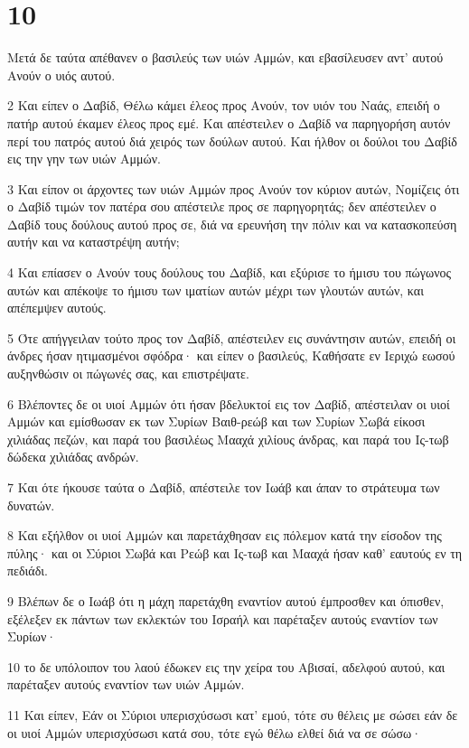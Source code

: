 \chapter{10}

\par Μετά δε ταύτα απέθανεν ο βασιλεύς των υιών Αμμών, και εβασίλευσεν αντ' αυτού Ανούν ο υιός αυτού.
\par 2 Και είπεν ο Δαβίδ, Θέλω κάμει έλεος προς Ανούν, τον υιόν του Ναάς, επειδή ο πατήρ αυτού έκαμεν έλεος προς εμέ. Και απέστειλεν ο Δαβίδ να παρηγορήση αυτόν περί του πατρός αυτού διά χειρός των δούλων αυτού. Και ήλθον οι δούλοι του Δαβίδ εις την γην των υιών Αμμών.
\par 3 Και είπον οι άρχοντες των υιών Αμμών προς Ανούν τον κύριον αυτών, Νομίζεις ότι ο Δαβίδ τιμών τον πατέρα σου απέστειλε προς σε παρηγορητάς; δεν απέστειλεν ο Δαβίδ τους δούλους αυτού προς σε, διά να ερευνήση την πόλιν και να κατασκοπεύση αυτήν και να καταστρέψη αυτήν;
\par 4 Και επίασεν ο Ανούν τους δούλους του Δαβίδ, και εξύρισε το ήμισυ του πώγωνος αυτών και απέκοψε το ήμισυ των ιματίων αυτών μέχρι των γλουτών αυτών, και απέπεμψεν αυτούς.
\par 5 Ότε απήγγειλαν τούτο προς τον Δαβίδ, απέστειλεν εις συνάντησιν αυτών, επειδή οι άνδρες ήσαν ητιμασμένοι σφόδρα· και είπεν ο βασιλεύς, Καθήσατε εν Ιεριχώ εωσού αυξηνθώσιν οι πώγωνές σας, και επιστρέψατε.
\par 6 Βλέποντες δε οι υιοί Αμμών ότι ήσαν βδελυκτοί εις τον Δαβίδ, απέστειλαν οι υιοί Αμμών και εμίσθωσαν εκ των Συρίων Βαιθ-ρεώβ και των Συρίων Σωβά είκοσι χιλιάδας πεζών, και παρά του βασιλέως Μααχά χιλίους άνδρας, και παρά του Ις-τωβ δώδεκα χιλιάδας ανδρών.
\par 7 Και ότε ήκουσε ταύτα ο Δαβίδ, απέστειλε τον Ιωάβ και άπαν το στράτευμα των δυνατών.
\par 8 Και εξήλθον οι υιοί Αμμών και παρετάχθησαν εις πόλεμον κατά την είσοδον της πύλης· και οι Σύριοι Σωβά και Ρεώβ και Ις-τωβ και Μααχά ήσαν καθ' εαυτούς εν τη πεδιάδι.
\par 9 Βλέπων δε ο Ιωάβ ότι η μάχη παρετάχθη εναντίον αυτού έμπροσθεν και όπισθεν, εξέλεξεν εκ πάντων των εκλεκτών του Ισραήλ και παρέταξεν αυτούς εναντίον των Συρίων·
\par 10 το δε υπόλοιπον του λαού έδωκεν εις την χείρα του Αβισαί, αδελφού αυτού, και παρέταξεν αυτούς εναντίον των υιών Αμμών.
\par 11 Και είπεν, Εάν οι Σύριοι υπερισχύσωσι κατ' εμού, τότε συ θέλεις με σώσει εάν δε οι υιοί Αμμών υπερισχύσωσι κατά σου, τότε εγώ θέλω ελθεί διά να σε σώσω·
